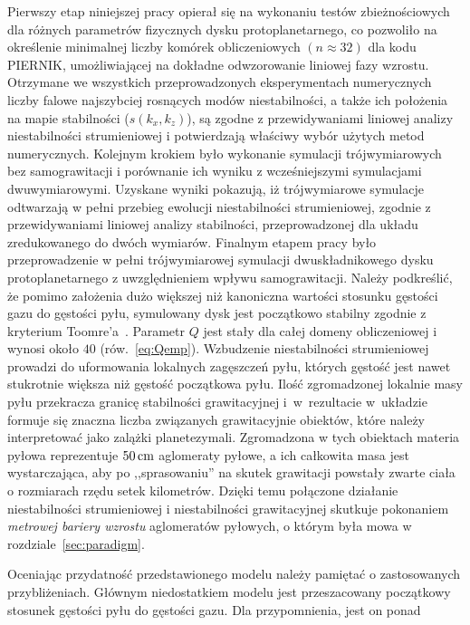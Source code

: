 %
\par Pierwszy etap niniejszej pracy opierał się na wykonaniu testów
zbieżnościowych dla różnych parametrów fizycznych dysku protoplanetarnego, co
pozwoliło na określenie minimalnej liczby komórek obliczeniowych $(n\approx32)$
dla kodu \textsc{PIERNIK}, umożliwiającej na dokładne odwzorowanie liniowej fazy
wzrostu.  Otrzymane we wszystkich przeprowadzonych eksperymentach numerycznych
liczby falowe najszybciej rosnących modów niestabilności, a także ich położenia na
mapie stabilności ($s(k_x, k_z)$), są zgodne z przewidywaniami liniowej analizy
niestabilności strumieniowej i potwierdzają właściwy wybór użytych metod
numerycznych. Kolejnym krokiem było wykonanie symulacji trójwymiarowych bez
samograwitacji i porównanie ich wyniku z wcześniejszymi symulacjami
dwuwymiarowymi. Uzyskane wyniki pokazują, iż trójwymiarowe symulacje odtwarzają w
pełni przebieg ewolucji niestabilności strumieniowej, zgodnie z przewidywaniami
liniowej analizy stabilności, przeprowadzonej dla układu zredukowanego do dwóch
wymiarów. Finalnym etapem pracy było przeprowadzenie w pełni trójwymiarowej
symulacji dwuskładnikowego dysku protoplanetarnego z uwzględnieniem wpływu
samograwitacji. Należy podkreślić, że pomimo założenia dużo większej niż
kanoniczna wartości stosunku gęstości gazu do gęstości pyłu, symulowany dysk
jest początkowo stabilny zgodnie z kryterium Toomre'a~.
Parametr $Q$ jest stały dla całej domeny obliczeniowej i wynosi około $40$
(rów.~\ref{eq:Qemp}). Wzbudzenie niestabilności strumieniowej prowadzi do
uformowania lokalnych zagęszczeń pyłu, których gęstość jest nawet stukrotnie
większa niż gęstość początkowa pyłu. Ilość zgromadzonej lokalnie masy pyłu
przekracza granicę stabilności grawitacyjnej i~w~rezultacie w~układzie formuje
się znaczna liczba związanych grawitacyjnie obiektów, które należy interpretować
jako zalążki planetezymali. Zgromadzona w tych obiektach materia
pyłowa reprezentuje $50\hbox{$\thinspace\textrm{cm}$}$ aglomeraty pyłowe, a ich całkowita masa jest
wystarczająca, aby po ,,sprasowaniu'' na skutek grawitacji powstały zwarte ciała o
rozmiarach rzędu setek kilometrów. Dzięki temu połączone działanie
niestabilności strumieniowej i niestabilności grawitacyjnej skutkuje pokonaniem
\emph{metrowej bariery wzrostu} aglomeratów pyłowych, o którym była mowa w
rozdziale~\ref{sec:paradigm}.
%
\par 
Oceniając przydatność przedstawionego modelu należy pamiętać o zastosowanych
przybliżeniach. Głównym niedostatkiem modelu jest przeszacowany początkowy
stosunek gęstości pyłu do gęstości gazu. Dla przypomnienia, jest on ponad
